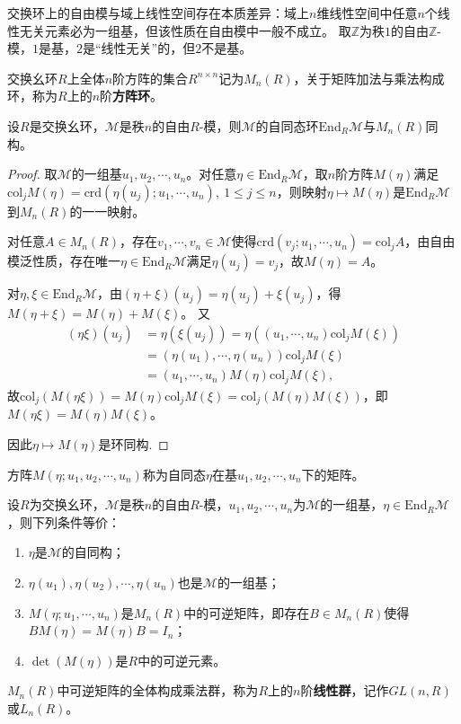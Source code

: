 \documentclass[../../main.tex]{subfiles}%
\begin{document}
\begin{example}
交换环上的自由模与域上线性空间存在本质差异：域上$n$维线性空间中任意$n$个线性无关元素必为一组基，但该性质在自由模中一般不成立。
取$\mathbb Z$为秩$1$的自由$\mathbb Z$-模，$1$是基，$2$是“线性无关”的，但$2$不是基。
\end{example}

\begin{definition}
交换幺环$R$上全体$n$阶方阵的集合$R^{n\times n}$记为$M_n(R)$，关于矩阵加法与乘法构成环，称为$R$上的$n$阶\textbf{方阵环}。
\end{definition}

\begin{theorem}
设$R$是交换幺环，$\mathscr{M}$是秩$n$的自由$R$-模，则$\mathscr{M}$的自同态环$\mathrm{End}_R\mathscr{M}$与$M_n(R)$同构。
\end{theorem}

\begin{proof}
取$\mathscr{M}$的一组基$u_1,u_2,\cdots,u_n$。对任意$\eta\in\mathrm{End}_R\mathscr{M}$，取$n$阶方阵$M(\eta)$满足$\mathrm{col}_j M(\eta)=\mathrm{crd}(\eta(u_j);u_1,\cdots,u_n),\ 1\leqslant j\leqslant n$，则映射$\eta\mapsto M(\eta)$是$\mathrm{End}_R\mathscr{M}$到$M_n(R)$的一一映射。

对任意$A\in M_n(R)$，存在$v_1,\cdots,v_n\in\mathscr{M}$使得$\mathrm{crd}(v_j;u_1,\cdots,u_n)=\mathrm{col}_j A$，由自由模泛性质，存在唯一$\eta\in\mathrm{End}_R\mathscr{M}$满足$\eta(u_j)=v_j$，故$M(\eta)=A$。

对$\eta,\xi\in\mathrm{End}_R\mathscr{M}$，由$(\eta+\xi)(u_j)=\eta(u_j)+\xi(u_j)$，得$M(\eta+\xi)=M(\eta)+M(\xi)$。
又
\begin{align*}
(\eta\xi)(u_j)&=\eta(\xi(u_j))=\eta\left((u_1,\cdots,u_n)\mathrm{col}_j M(\xi)\right)\\
&=(\eta(u_1),\cdots,\eta(u_n))\mathrm{col}_j M(\xi)\\
&=(u_1,\cdots,u_n)M(\eta)\mathrm{col}_j M(\xi),
\end{align*}
故$\mathrm{col}_j(M(\eta\xi))=M(\eta)\mathrm{col}_j M(\xi)=\mathrm{col}_j(M(\eta)M(\xi))$，即$M(\eta\xi)=M(\eta)M(\xi)$。

因此$\eta\mapsto M(\eta)$是环同构.
\end{proof}

\begin{remark}
方阵$M(\eta;u_1,u_2,\cdots,u_n)$称为自同态$\eta$在基$u_1,u_2,\cdots,u_n$下的矩阵。
\end{remark}

\begin{theorem}
设$R$为交换幺环，$\mathscr{M}$是秩$n$的自由$R$-模，$u_1,u_2,\cdots,u_n$为$\mathscr{M}$的一组基，$\eta\in\mathrm{End}_R\mathscr{M}$，则下列条件等价：
\begin{enumerate}[(1)]
\item $\eta$是$\mathscr{M}$的自同构；
\item $\eta(u_1),\eta(u_2),\cdots,\eta(u_n)$也是$\mathscr{M}$的一组基；
\item $M(\eta;u_1,\cdots,u_n)$是$M_n(R)$中的可逆矩阵，即存在$B\in M_n(R)$使得$BM(\eta)=M(\eta)B=I_n$；
\item $\det(M(\eta))$是$R$中的可逆元素。
\end{enumerate}
\end{theorem}

\begin{definition}
$M_n(R)$中可逆矩阵的全体构成乘法群，称为$R$上的$n$阶\textbf{线性群}，记作$GL(n,R)$或$L_n(R)$。
\end{definition}
\end{document}
